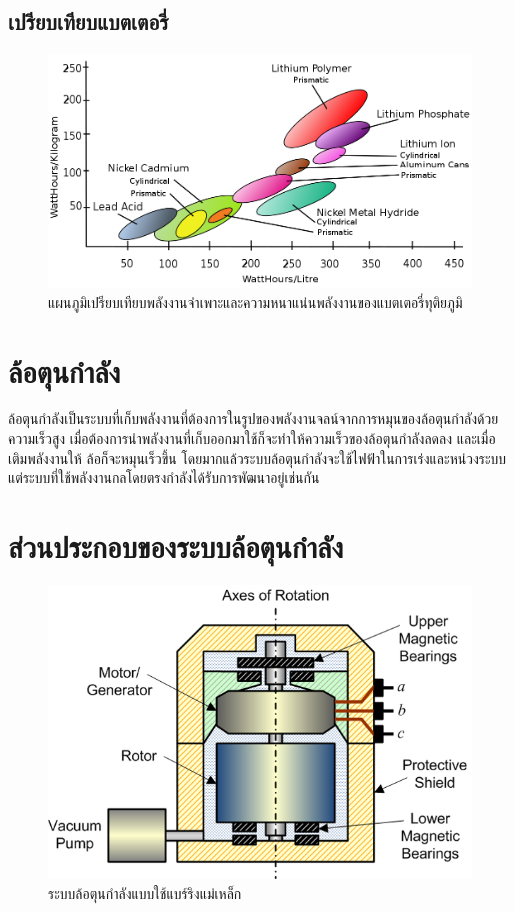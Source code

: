 \documentclass[a4paper,nobib,openany,10pt]{tufte-book}
\begin{document}
\subsection{เปรียบเทียบแบตเตอรี่}
\label{sec:org92a5fb9}

\begin{figure}[htbp]
\centering
\includegraphics[width=.9\linewidth]{./pictures/battery-energy-density-comparison.png}
\caption{\label{fig: battery energy density comparison}แผนภูมิเปรียบเทียบพลังงานจำเพาะและความหนาแน่นพลังงานของแบตเตอรี่ทุติยภูมิ}
\end{figure}

\section{ล้อตุนกำลัง}
\label{sec:orgd723518}

ล้อตุนกำลังเป็นระบบที่เก็บพลังงานที่ต้องการในรูปของพลังงานจลน์จากการหมุนของล้อตุนกำลังด้วยความเร็วสูง เมื่อต้องการนำพลังงานที่เก็บออกมาใช้ก็จะทำให้ความเร็วของล้อตุนกำลังลดลง และเมื่อเติมพลังงานให้ ล้อก็จะหมุนเร็วขึ้น โดยมากแล้วระบบล้อตุนกำลังจะใช้ไฟฟ้าในการเร่งและหน่วงระบบ แต่ระบบที่ใช้พลังงานกลโดยตรงกำลังได้รับการพัฒนาอยู่เช่นกัน

\section{ส่วนประกอบของระบบล้อตุนกำลัง}
\label{sec:orgea4487c}

\begin{figure}[htbp]
\centering
\includegraphics[width=.9\linewidth]{./pictures/flywheel-components.png}
\caption{ระบบล้อตุนกำลังแบบใช้แบร์ริงแม่เหล็ก}
\end{figure}
\end{document}
